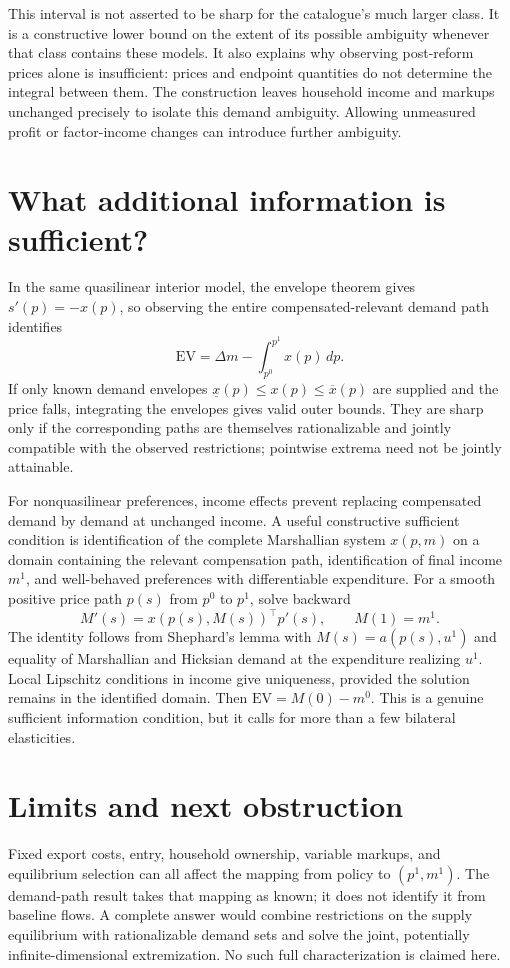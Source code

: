 \documentclass[11pt]{article}
\begin{document}
This interval is not asserted to be sharp for the catalogue's much larger class. It is a constructive lower bound on the extent of its possible ambiguity whenever that class contains these models. It also explains why observing post-reform prices alone is insufficient: prices and endpoint quantities do not determine the integral between them. The construction leaves household income and markups unchanged precisely to isolate this demand ambiguity. Allowing unmeasured profit or factor-income changes can introduce further ambiguity.

\section*{What additional information is sufficient?}
In the same quasilinear interior model, the envelope theorem gives $s'(p)=-x(p)$, so observing the entire compensated-relevant demand path identifies
\[
 \mathrm{EV}=\Delta m-\int_{p^0}^{p^1}x(p)\,dp.
\]
If only known demand envelopes $\underline x(p)\leq x(p)\leq\overline x(p)$ are supplied and the price falls, integrating the envelopes gives valid outer bounds. They are sharp only if the corresponding paths are themselves rationalizable and jointly compatible with the observed restrictions; pointwise extrema need not be jointly attainable.

For nonquasilinear preferences, income effects prevent replacing compensated demand by demand at unchanged income. A useful constructive sufficient condition is identification of the complete Marshallian system $x(p,m)$ on a domain containing the relevant compensation path, identification of final income $m^1$, and well-behaved preferences with differentiable expenditure. For a smooth positive price path $p(s)$ from $p^0$ to $p^1$, solve backward
\[
 M'(s)=x(p(s),M(s))^\top p'(s),\qquad M(1)=m^1.
\]
The identity follows from Shephard's lemma with $M(s)=a(p(s),u^1)$ and equality of Marshallian and Hicksian demand at the expenditure realizing $u^1$. Local Lipschitz conditions in income give uniqueness, provided the solution remains in the identified domain. Then $\mathrm{EV}=M(0)-m^0$. This is a genuine sufficient information condition, but it calls for more than a few bilateral elasticities.

\section*{Limits and next obstruction}
Fixed export costs, entry, household ownership, variable markups, and equilibrium selection can all affect the mapping from policy to $(p^1,m^1)$. The demand-path result takes that mapping as known; it does not identify it from baseline flows. A complete answer would combine restrictions on the supply equilibrium with rationalizable demand sets and solve the joint, potentially infinite-dimensional extremization. No such full characterization is claimed here.
\end{document}
